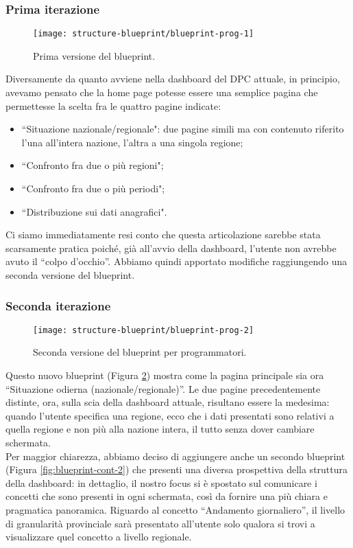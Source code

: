 \subsubsection{Prima iterazione}
\begin{figure}[H]
    \centering
    \texttt{[image: structure-blueprint/blueprint-prog-1]}
    \caption{Prima versione del blueprint.}\label{fig:blueprint-prog-1}
\end{figure}
Diversamente da quanto avviene nella dashboard del DPC attuale, in principio, avevamo pensato che la home page potesse essere una semplice pagina che permettesse la scelta fra le quattro pagine indicate:
\begin{itemize}
    \item ``Situazione nazionale/regionale": due pagine simili ma con contenuto riferito l'una all'intera nazione, l'altra a una singola regione;
    \item ``Confronto fra due o più regioni";
    \item ``Confronto fra due o più periodi";
    \item ``Distribuzione sui dati anagrafici".
\end{itemize}
Ci siamo immediatamente resi conto che questa articolazione sarebbe stata scarsamente pratica poiché, già all'avvio della dashboard, l'utente non avrebbe avuto il ``colpo d'occhio''. Abbiamo quindi apportato modifiche raggiungendo una seconda versione del blueprint.

\subsubsection{Seconda iterazione}\label{ss:seconda-iterazione}
\begin{figure}[H]
    \centering
    \texttt{[image: structure-blueprint/blueprint-prog-2]}
    \caption{Seconda versione del blueprint per programmatori.}\label{fig:blueprint-prog-2}
\end{figure}
Questo nuovo blueprint (Figura \ref{fig:blueprint-prog-2}) mostra come la pagina principale sia ora ``Situazione odierna (nazionale/regionale)''. Le due pagine precedentemente distinte, ora, sulla scia della dashboard attuale, risultano essere la medesima: quando l'utente specifica una regione, ecco che i dati presentati sono relativi a quella regione e non più alla nazione intera, il tutto senza dover cambiare schermata.\\
\noindent
Per maggior chiarezza, abbiamo deciso di aggiungere anche un secondo blueprint (Figura \ref{fig:blueprint-cont-2}) che presenti una diversa prospettiva della struttura della dashboard: in dettaglio, il nostro focus si è spostato sul comunicare i concetti che sono presenti in ogni schermata, così da fornire una più chiara e pragmatica panoramica.
Riguardo al concetto ``Andamento giornaliero'', il livello di granularità provinciale sarà presentato all'utente solo qualora si trovi a visualizzare quel concetto a livello regionale.

